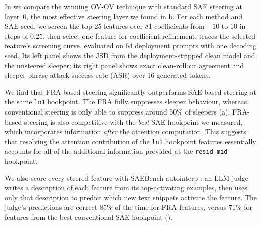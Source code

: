 \documentclass{article} %
\theoremstyle{plain}
\theoremstyle{definition}
\theoremstyle{remark}
\begin{document}

In  we compare the winning OV-OV technique with standard SAE steering at layer~0, the most effective steering layer we found in b. For each method and SAE seed, we screen the top 25 features over 81 coefficients from $-10$ to $10$ in steps of $0.25$, then select one feature for coefficient refinement.  traces the selected feature's screening curve, evaluated on 64 deployment prompts with one decoding seed. Its left panel shows the JSD from the deployment-stripped clean model and the unsteered sleeper; its right panel shows exact clean-rollout agreement and sleeper-phrase attack-success rate (ASR) over 16 generated tokens.

We find that FRA-based steering significantly outperforms SAE-based steering at the same \texttt{ln1} hookpoint. The FRA fully suppresses sleeper behaviour, whereas conventional steering is only able to suppress around 50\% of sleepers (a). FRA-based steering is also competitive with the \textit{best} SAE hookpoint we measured, which incorporates information \textit{after} the attention computation. This suggests that resolving the attention contribution of the \texttt{ln1} hookpoint features essentially accounts for all of the additional information provided at the \texttt{resid\_mid} hookpoint.

We also score every steered feature with SAEBench autointerp \citep{karvonen2025saebench}: an LLM judge writes a description of each feature from its top-activating examples, then uses only that description to predict which new text snippets activate the feature. The judge's predictions are correct 85\% of the time for FRA features, versus 71\% for features from the best conventional SAE hookpoint ().

\end{document}
